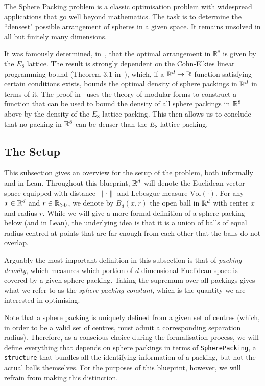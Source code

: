 The Sphere Packing problem is a classic optimisation problem with widespread applications that go well beyond mathematics. The task is to determine the ``densest" possible arrangement of spheres in a given space. It remains unsolved in all but finitely many dimensions.

It was famously determined, in~\cite{Via2017}, that the optimal arrangement in $\mathbb{R}^8$ is given by the $E_8$ lattice. The result is strongly dependent on the Cohn-Elkies linear programming bound (Theorem 3.1 in~\cite{ElkiesCohn}), which, if a $\mathbb{R}^d \to \mathbb{R}$ function satisfying certain conditions exists, bounds the optimal density of sphere packings in $\mathbb{R}^d$ in terms of it. The proof in~\cite{Via2017} uses the theory of modular forms to construct a function that can be used to bound the density of all sphere packings in $\mathbb{R}^8$ above by the density of the $E_8$ lattice packing. This then allows us to conclude that no packing in $\mathbb{R}^8$ can be denser than the $E_8$ lattice packing.

\subsection{The Setup}

This subsection gives an overview for the setup of the problem, both informally and in Lean. Throughout this blueprint, $\mathbb{R}^d$ will denote the Euclidean vector space equipped with distance $\|\cdot\|$ and Lebesgue measure $\mathrm{Vol}(\cdot)$. For any $x\in\mathbb{R}^d$ and $r\in\mathbb{R}_{>0}$, we denote by $B_d(x,r)$ the open ball in $\mathbb{R}^d$ with center $x$ and radius $r$. While we will give a more formal definition of a sphere packing below (and in Lean), the underlying idea is that it is a union of balls of equal radius centred at points that are far enough from each other that the balls do not overlap.

Arguably the most important definition in this subsection is that of \emph{packing density}, which measures which portion of $d$-dimensional Euclidean space is covered by a given sphere packing. Taking the supremum over all packings gives what we refer to as the \emph{sphere packing constant}, which is the quantity we are interested in optimising.


\begin{remark}\label{SpherePacking}\leanok
  Note that a sphere packing is uniquely defined from a given set of centres (which, in order to be a valid set of centres, must admit a corresponding separation radius). Therefore, as a conscious choice during the formalisation process, we will define everything that depends on sphere packings in terms of \verb|SpherePacking|, a \verb|structure| that bundles all the identifying information of a packing, but not the actual balls themselves. For the purposes of this blueprint, however, we will refrain from making this distinction.
\end{remark}

